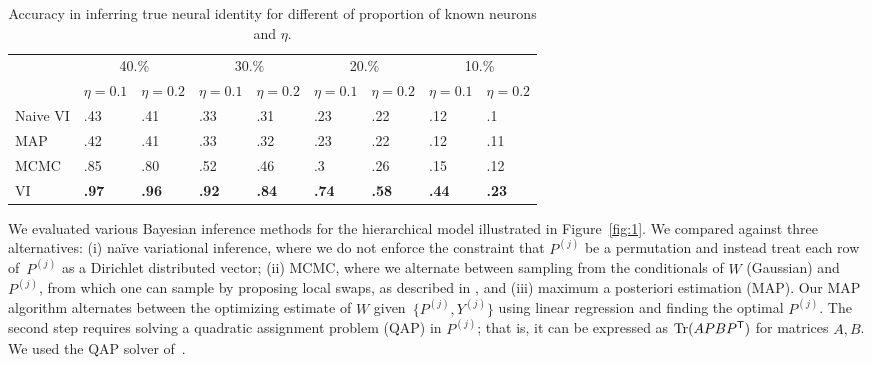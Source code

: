 \documentclass{article}
\begin{document}
\begin{table}[t]
  \caption{Accuracy in inferring true neural identity for different of
    proportion of known neurons and $\eta$.
  }%
   \label{table:celegans}
   \centering
   \begin{tabular}{lllllllll}
    & \multicolumn{2}{c}{40.\%} & \multicolumn{2}{c}{30.\%} & \multicolumn{2}{c}{20.\%} & \multicolumn{2}{c}{10.\%}\\
    \cmidrule(lr){2-3} \cmidrule(lr){4-5} \cmidrule(lr){6-7} \cmidrule(lr){8-9}
    & $\eta=0.1$ & $\eta=0.2$ & $\eta=0.1$ & $\eta=0.2$  & $\eta=0.1$ & $\eta=0.2$  & $\eta=0.1$ & $\eta=0.2$ \\
    \midrule 
    Naive VI & .43 & .41 & .33 & .31 & .23 & .22 & .12 & .1 \\
    MAP & .42 & .41  &.33 &.32& .23 & .22 & .12 & .11 \\
    MCMC   & .85 & .80  &.52 &.46& .3 & .26 & .15 & .12 \\
    VI   & \textbf{.97} & \textbf{.96} & \textbf{.92} & \textbf{.84} & \textbf{.74} & \textbf{.58} & \textbf{.44} & \textbf{.23} \\
              \bottomrule
   \end{tabular}
\end{table}

We evaluated various Bayesian inference methods for the hierarchical
model illustrated in Figure~\ref{fig:1}.
We compared against three alternatives: (i) na\"ive variational inference,
where we do not enforce the constraint that $P^{(j)}$ be a permutation
and instead treat each row of~$P^{(j)}$ as a Dirichlet distributed
vector; (ii) MCMC, where we alternate between sampling from the
conditionals of $W$ (Gaussian) and ${P^{(j)}}$, from which one can
sample by proposing local swaps, as described in \cite{Diaconis2009},
and (iii) maximum a posteriori estimation (MAP).  Our MAP algorithm
alternates between the optimizing estimate of $W$
given~$\{P^{(j)}, Y^{(j)}\}$ using linear regression and finding the
optimal ${P^{(j)}}$. The second step requires solving a quadratic
assignment problem (QAP) in ${P^{(j)}}$; that is, it can be expressed
as $\mathrm{Tr}(APBP^{\mathsf{T}})$ for matrices $A,B$. We used the QAP
solver of~\citet{Vogelstein2015}.
\end{document}
